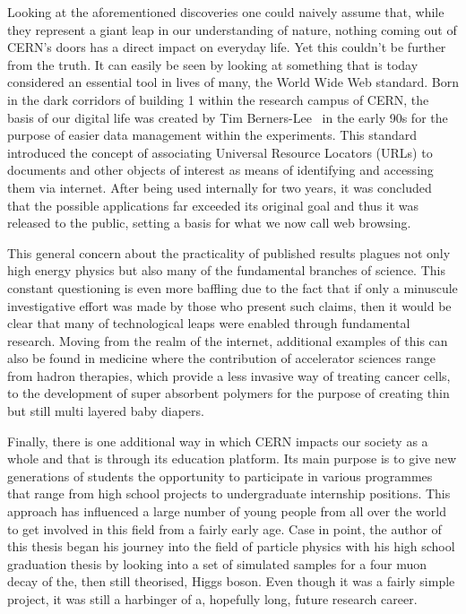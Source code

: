 \hspace{10pt}Looking at the aforementioned discoveries one could naively assume that, while they represent a giant leap in our understanding of nature, nothing coming out of CERN's doors has a direct impact on everyday life. Yet this couldn't be further from the truth. It can easily be seen by looking at something that is today considered an essential tool in lives of many, the World Wide Web standard. Born in the dark corridors of building 1 within the research campus of CERN, the basis of our digital life was created by Tim Berners-Lee~\cite{www_origins} in the early 90s for the purpose of easier data management within the experiments. This standard introduced the concept of associating Universal Resource Locators (URLs) to documents and other objects of interest as means of identifying and accessing them via internet. After being used internally for two years, it was concluded that the possible applications far exceeded its original goal and thus it was released to the public, setting a basis for what we now call web browsing.

\hspace{10pt}This general concern about the practicality of published results plagues not only high energy physics but also many of the fundamental branches of science. This constant questioning is even more baffling due to the fact that if only a minuscule investigative effort was made by those who present such claims, then it would be clear that many of technological leaps were enabled through fundamental research. Moving from the realm of the internet, additional examples of this can also be found in medicine where the contribution of accelerator sciences range from hadron therapies, which provide a less invasive way of treating cancer cells, to the development of super absorbent polymers for the purpose of creating thin but still multi layered baby diapers. %

\hspace{10pt} Finally, there is one additional way in which CERN impacts our society as a whole and that is through its education platform. Its main purpose is to give new generations of students the opportunity to participate in various programmes that range from high school projects to undergraduate internship positions. This approach has influenced a large number of young people from all over the world to get involved in this field from a fairly early age. Case in point, the author of this thesis began his journey into the field of particle physics with his high school graduation thesis by looking into a set of simulated samples for a four muon decay of the, then still theorised, Higgs boson. Even though it was a fairly simple project, it was still a harbinger of a, hopefully long, future research career.

